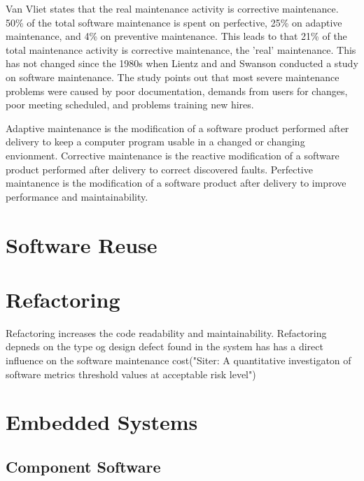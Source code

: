 Van Vliet\cite{Vliet:2008:SEP:1481475} states that the real maintenance activity is corrective maintenance. 50\% of the total software maintenance is spent on perfective, 25\% on adaptive maintenance, and 4\% on preventive maintenance. This leads to that 21\% of the total maintenance activity is corrective maintenance, the 'real' maintenance\cite{Vliet:2008:SEP:1481475}. This has not changed since the 1980s when Lientz and and Swanson conducted a study on software maintenance\cite{lientz1980software}. The study points out that most severe maintenance problems were caused by poor documentation, demands from users for changes, poor meeting scheduled, and problems training new hires.




Adaptive maintenance is the modification of a software product performed after delivery to keep a computer program usable in a changed or changing envionment. Corrective maintenance is the reactive modification of a software product performed after delivery to correct discovered faults. Perfective maintanence is the modification of a software product after delivery to improve performance and maintainability.


\section{Software Reuse}





\section{Refactoring}
Refactoring increases the code readability and maintainability. Refactoring depneds on the type og design defect found in the system has has a direct influence on the software maintenance cost("Siter: A quantitative investigaton of software metrics threshold values at acceptable risk level")




\section{Embedded Systems}

\subsection{Component Software}
